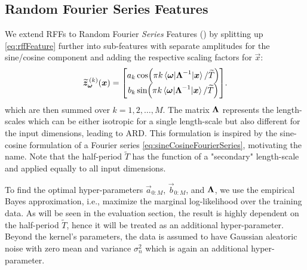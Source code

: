 \subsection{Random Fourier Series Features}
We extend \acp{RFF} to Random Fourier \emph{Series} Features () by splitting up \eqref{eq:rffFeature} further into sub-features with separate amplitudes for the sine/cosine component and adding the respective scaling factors for $\vec{x}$:
\begin{equation}
    \widetilde{\bm{z}}_{\bm{\omega}}^{\,(k)}(\bm{x}) =
        \begin{bmatrix}
            a_k \cos(\pi k \mel{\bm{\omega}}{\bm{\mathrm{\Lambda}}^{-1}}{\bm{x}} / \widetilde{T}) \\
            b_k \sin(\pi k \mel{\bm{\omega}}{\bm{\mathrm{\Lambda}}^{-1}}{\bm{x}} / \widetilde{T})
        \end{bmatrix}\!.
\end{equation}
which are then summed over $k = 1, 2, \dots, M$.
The matrix $\bm{\mathrm{\Lambda}}$ represents the length-scales which can be either isotropic for a single length-scale but also different for the input dimensions, leading to \ac{ARD}.
This formulation is inspired by the sine-cosine formulation of a Fourier series \eqref{eq:sineCosineFourierSeries}, motivating the name.
Note that the half-period $\tilde{T}$ has the function of a "secondary" length-scale and applied equally to all input dimensions.

To find the optimal hyper-parameters $\vec{a}_{0:M}$, $\vec{b}_{0:M}$, and $\bm{\mathrm{\Lambda}}$, we use the empirical Bayes approximation\cite[p.\,165]{bishopPatternRecognitionMachine2006}, i.e., maximize the marginal log-likelihood over the training data.
As will be seen in the evaluation section, the result is highly dependent on the half-period $\tilde{T}$, hence it will be treated as an additional hyper-parameter.  
Beyond the kernel's parameters, the data is assumed to have Gaussian aleatoric noise with zero mean and variance $\sigma_n^2$ which is again an additional hyper-parameter.














